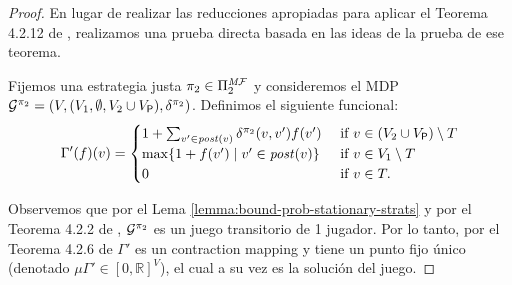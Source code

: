 \begin{proof}
  En lugar de realizar las reducciones apropiadas para aplicar el Teorema
  4.2.12 de \cite[p.~174]{FilarV96}, realizamos una prueba directa basada en las ideas
  de la prueba de ese teorema.
  
  Fijemos una estrategia justa $\pi_{2} \in \Pi^{\textit{M}\mathcal{F}}_{2}$ y
  consideremos el MDP
  $\mathcal{G}^{\pi_{2}} = (V, (V_1, \emptyset, V_2 \cup V_{\mathsf{P}}), \delta^{\pi_{2}})$.
  Definimos el siguiente funcional:
  \[
  \Gamma'(f)(v) =
  \begin{cases}
    1 + \sum_{v' \in \mathit{post}(v)} \delta^{\pi_{2}}(v,v')  f(v') & \text{ if } v \in (V_2 \cup V_{\mathsf{P}}) \setminus T  \\
    \max \{1  + f(v') \mid v' \in \mathit{post}(v) \} & \text{ if } v \in  V_1 \setminus T \\
    0 & \text{ if } v \in T.
  \end{cases}
  \]
  
  Observemos que por el Lema \ref{lemma:bound-prob-stationary-strats} y por el Teorema 4.2.2 de \cite{FilarV96},  $\mathcal{G}^{\pi_{2}}$
  es un juego transitorio de 1 jugador. Por lo tanto, por el Teorema 4.2.6 de \cite{FilarV96} $\Gamma'$ es un contraction mapping y tiene un punto fijo único (denotado $\mu \Gamma' \in [0,\mathbb{R}]^V$), el cual a su vez es la solución del juego.
  

\end{proof}
